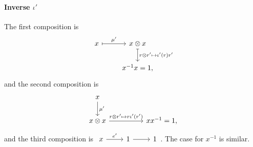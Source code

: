 \documentclass{article}
\theoremstyle{definition}
\newcommand{\tensor}[2]{#1\otimes#2}
\begin{document}
\paragraph{Inverse $\iota'$} The first composition is
$$
\begin{tikzcd}
  x \arrow[r, mapsto, "\mu'"] & {\tensor x x} \arrow[d, mapsto, "{\tensor{r}{r'}\mapsto\iota'(r)r'}"]\\
  & {x^{-1}x=1}, 
\end{tikzcd}
$$ and the second composition is
$$
\begin{tikzcd}[column sep=huge]
  x \arrow[d, "\mu'"] \\
  {\tensor x x} \arrow[r, "{\tensor{r}{r'}\mapsto r\iota'(r')}"] & x x^{-1}=1,
\end{tikzcd}
$$ and the third composition is $
\begin{tikzcd}
  x \arrow[r, "e'"] & 1 \arrow[r] & 1
\end{tikzcd}
$. The case for $x^{-1}$ is similar.
\end{document}
